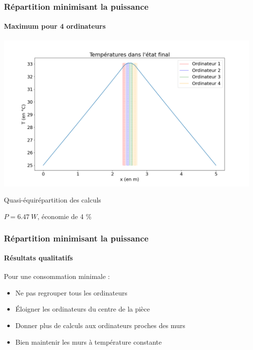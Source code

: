 \documentclass[a4paper,11pt]{beamer}
\begin{document}
\begin{frame}
    \frametitle{Répartition minimisant la puissance}
    \framesubtitle{Maximum pour 4 ordinateurs}

    \includegraphics[width=\textwidth]{temperatures_finales_maximum.png}

    \begin{center}
        Quasi-équirépartition des calculs

        $P = \SI{6,47}{W}$, économie de 4 \%
    \end{center}
\end{frame}

\begin{frame}
    \frametitle{Répartition minimisant la puissance}
    \framesubtitle{Résultats qualitatifs}

    Pour une consommation minimale :
    \begin{itemize}
        \item Ne pas regrouper tous les ordinateurs
        \item Éloigner les ordinateurs du centre de la pièce
        \item Donner plus de calculs aux ordinateurs proches des murs
        \item Bien maintenir les murs à température constante
    \end{itemize}
\end{frame}
\end{document}
